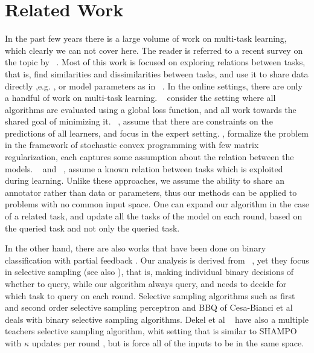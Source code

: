 \chapter{Related Work}

In the past few years there is a large volume of work on multi-task learning, which clearly we can not 
cover here. The reader is referred to a recent survey on the topic by ~\cite{10.1109/TKDE.2009.191}. 
Most of this work is focused on exploring relations between tasks, that is, 
find similarities and dissimilarities  between tasks, and use it to share data directly ,e.g. 
\cite{NIPS2012_0706}, or model parameters as in ~\cite{Evgeniou:2004:RML:1014052.1014067,Daume:2010:FES:1870526.1870534,DBLP:journals/ml/ArgyriouEP08}. 
In the online settings, there are only a handful of work on multi-task learning. 
~\cite{DBLP:conf/colt/DekelLS06} consider the setting where all algorithms are evaluated using a 
global loss function, and all work towards the shared goal of minimizing it. 
~\cite{DBLP:conf/colt/LugosiPS09}, assume that there are constraints on the predictions of all 
learners, and focus in the expert setting. \cite{Agarwal:EECS-2008-138}, formalize the 
problem in the framework of stochastic convex programming with few matrix regularization, each 
captures some assumption about the relation between the models. 
~\cite{DBLP:journals/jmlr/CavallantiCG10} and ~\cite{cesa2006incremental}, 
assume a known relation between tasks which is exploited during learning. 
Unlike these approaches, we assume the ability to share an annotator rather than data or parameters, 
thus our methods can be applied to problems with no common input space. One can 
expand our algorithm in the case of a related task, and update all the tasks of the model  on each round, 
based on the queried task and not only the queried task.

In the other hand, there are also works that have been done on binary classification with partial feedback . 
Our analysis is derived from ~\cite{cesa2006worst}, yet they focus in selective 
sampling (see also \cite{cesa2009robust,dekel2010robust,crammer2014doubly}), that is, making individual 
binary decisions of whether to query, while our algorithm always query, and needs to decide for which task 
to query on each round.
Selective sampling algorithms such as first and second order selective sampling perceptron and   
BBQ  of Cesa-Bianci et al~\cite{cesa2006worst,cesa2009robust} deals with binary selective 
sampling algorithms. Dekel et al ~\cite{dekel2010robust} have also a multiple teachers selective sampling 
algorithm, whit setting that is similar to SHAMPO with $\kappa$ updates per round , but is force all of the 
inputs to be in the same space.

